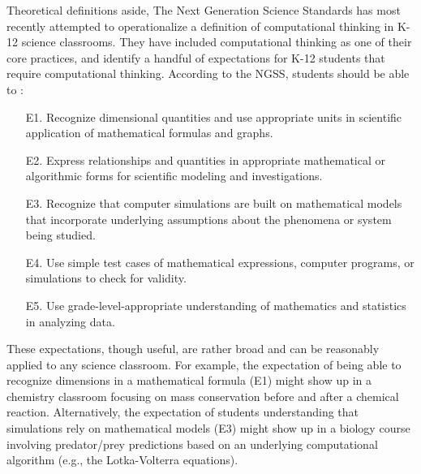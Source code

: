 \documentclass{msuphddissertation}
\begin{document}
\begin{doublespace}

Theoretical definitions aside, The Next Generation Science Standards has most recently attempted to operationalize a definition of computational thinking in K-12 science classrooms.  They have included computational thinking as one of their core practices, and identify a handful of expectations for K-12 students that require computational thinking.  According to the NGSS, students should be able to \cite{NGSS2012}: \begin{enumerate}
\item[E1.] Recognize dimensional quantities and use appropriate units in scientific application of mathematical formulas and graphs.

\item[E2.] Express relationships and quantities in appropriate mathematical or algorithmic forms for scientific modeling and investigations.

\item[E3.] Recognize that computer simulations are built on mathematical models that incorporate underlying assumptions about the phenomena or system being studied.

\item[E4.] Use simple test cases of mathematical expressions, computer programs, or simulations to check for validity.

\item[E5.] Use grade-level-appropriate understanding of mathematics and statistics in analyzing data.
\end{enumerate}

These expectations, though useful, are rather broad and can be reasonably applied to any science classroom.  For example, the expectation of being able to recognize dimensions in a mathematical formula (E1) might show up in a chemistry classroom focusing on mass conservation before and after a chemical reaction.  Alternatively, the expectation of students understanding that simulations rely on mathematical models (E3) might show up in a biology course involving predator/prey predictions based on an underlying computational algorithm (e.g., the Lotka-Volterra equations). 


\end{doublespace}
\end{document}

